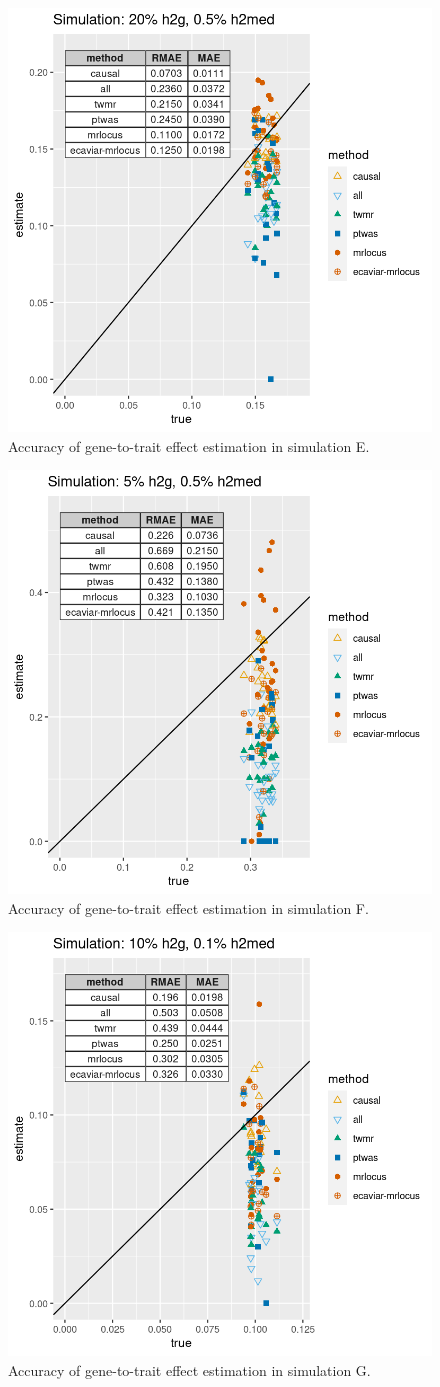 \documentclass[11pt]{article}
\begin{document}
\begin{figure}[!ht]
  \centering
  \includegraphics[width=.6\textwidth]{figs/sim6.png}
  \caption{Accuracy of gene-to-trait effect estimation in simulation E.}
\end{figure}

\begin{figure}[!ht]
  \centering
  \includegraphics[width=.6\textwidth]{figs/sim8.png}
  \caption{Accuracy of gene-to-trait effect estimation in simulation F.}
\end{figure}

\begin{figure}[!ht]
  \centering
  \includegraphics[width=.6\textwidth]{figs/sim5.png}
  \caption{Accuracy of gene-to-trait effect estimation in simulation G.}
\end{figure}
\end{document}
